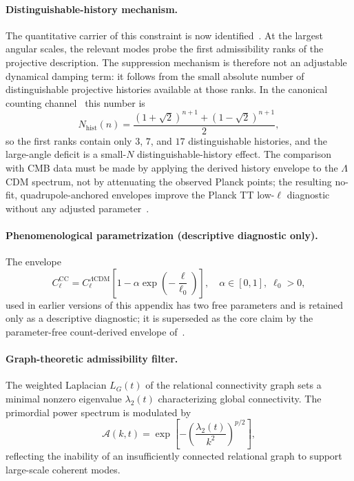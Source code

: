   \paragraph{Distinguishable-history mechanism.}
    The quantitative carrier of this constraint is now identified~\cite{Beau2026dhc}.
    At the largest angular scales, the relevant modes probe the first admissibility ranks of the
    projective description.
    The suppression mechanism is therefore not an adjustable dynamical damping term: it follows
    from the small absolute number of distinguishable projective histories available at those
    ranks.
    In the canonical counting channel~\cite{Beau2026tb} this number is
    \[
      N_{\mathrm{hist}}(n)
      = \frac{(1+\sqrt{2})^{n+1}+(1-\sqrt{2})^{n+1}}{2},
    \]
    so the first ranks contain only $3$, $7$, and $17$ distinguishable histories, and the
    large-angle deficit is a small-$N$ distinguishable-history effect.
    The comparison with CMB data must be made by applying the derived history envelope to the
    $\Lambda$CDM spectrum, not by attenuating the observed Planck points; the resulting no-fit,
    quadrupole-anchored envelopes improve the Planck TT low-$\ell$ diagnostic without any adjusted
    parameter~\cite{Beau2026dhc}.

  \paragraph{Phenomenological parametrization (descriptive diagnostic only).}
    The envelope
    \begin{equation}
      C_\ell^{\mathrm{CC}}
      = C_\ell^{\Lambda\mathrm{CDM}}
      \left[
        1 - \alpha
        \exp\!\left(-\frac{\ell}{\ell_0}\right)
      \right],
      \quad
      \alpha \in [0,1],\;\ell_0 > 0,
      \label{eq:cc_lowell_envelope}
    \end{equation}
    used in earlier versions of this appendix has two free parameters and is retained only as a
    descriptive diagnostic; it is superseded as the core claim by the parameter-free count-derived
    envelope of~\cite{Beau2026dhc}.

  \paragraph{Graph-theoretic admissibility filter.}
    The weighted Laplacian $L_G(t)$ of the relational connectivity graph
    sets a minimal nonzero eigenvalue $\lambda_2(t)$ characterizing global
    connectivity.
    The primordial power spectrum is modulated by
    \[
      \mathcal{A}(k,t)
      = \exp\!\left[
                -\left(
                   \frac{\lambda_2(t)}{k^2}
        \right)^{\!p/2}
      \right],
    \]
    reflecting the inability of an insufficiently connected relational graph
    to support large-scale coherent modes.

